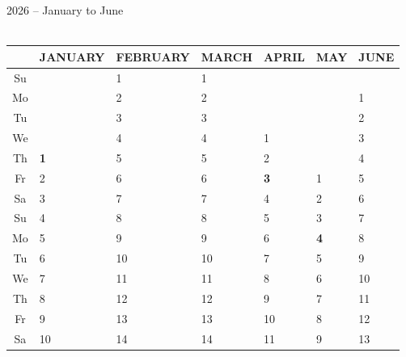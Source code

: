 \documentclass[a4paper]{article}
\newcommand{\monthstrut}{\rule{0pt}{12pt}}
\newcommand{\datestrut}{\rule{0pt}{12pt}}
\begin{document}
\pagestyle{empty}

\begin{center}
\hspace{1cm} {\LARGE 2026 -- January to June}\\
{\ } \\
\begin{tabular}{|c||p{2.5cm}|p{2.5cm}|p{2.5cm}|p{2.5cm}|p{2.5cm}|p{2.5cm}|}
\hline
 \multicolumn{1}{|c||}{\monthstrut\ }
 & \multicolumn{1}{|c|}{JANUARY}
 & \multicolumn{1}{|c|}{FEBRUARY}
 & \multicolumn{1}{|c|}{MARCH}
 & \multicolumn{1}{|c|}{APRIL}
 & \multicolumn{1}{|c|}{MAY}
 & \multicolumn{1}{|c|}{JUNE}
\\
\hline
\hline
\datestrut Su &  & 1 & 1 &  &  &  \\
\hline\hline
\datestrut Mo &  & 2 & 2 &  &  & 1 \\
\cline{1-1}\cline{3-3}\cline{4-4}\cline{7-7}
\datestrut Tu &  & 3 & 3 &  &  & 2 \\
\cline{1-1}\cline{3-3}\cline{4-4}\cline{5-5}\cline{7-7}
\datestrut We &  & 4 & 4 & 1 &  & 3 \\
\cline{1-1}\cline{2-2}\cline{3-3}\cline{4-4}\cline{5-5}\cline{7-7}
\datestrut Th & \textbf{1} & 5 & 5 & 2 &  & 4 \\
\cline{1-1}\cline{2-2}\cline{3-3}\cline{4-4}\cline{5-5}\cline{6-6}\cline{7-7}
\datestrut Fr & 2 & 6 & 6 & \textbf{3} & 1 & 5 \\
\cline{1-1}\cline{2-2}\cline{3-3}\cline{4-4}\cline{5-5}\cline{6-6}\cline{7-7}
\datestrut Sa & 3 & 7 & 7 & 4 & 2 & 6 \\
\cline{1-1}\cline{2-2}\cline{3-3}\cline{4-4}\cline{5-5}\cline{6-6}\cline{7-7}
\datestrut Su & 4 & 8 & 8 & 5 & 3 & 7 \\
\hline\hline
\datestrut Mo & 5 & 9 & 9 & 6 & \textbf{4} & 8 \\
\cline{1-1}\cline{2-2}\cline{3-3}\cline{4-4}\cline{5-5}\cline{6-6}\cline{7-7}
\datestrut Tu & 6 & 10 & 10 & 7 & 5 & 9 \\
\cline{1-1}\cline{2-2}\cline{3-3}\cline{4-4}\cline{5-5}\cline{6-6}\cline{7-7}
\datestrut We & 7 & 11 & 11 & 8 & 6 & 10 \\
\cline{1-1}\cline{2-2}\cline{3-3}\cline{4-4}\cline{5-5}\cline{6-6}\cline{7-7}
\datestrut Th & 8 & 12 & 12 & 9 & 7 & 11 \\
\cline{1-1}\cline{2-2}\cline{3-3}\cline{4-4}\cline{5-5}\cline{6-6}\cline{7-7}
\datestrut Fr & 9 & 13 & 13 & 10 & 8 & 12 \\
\cline{1-1}\cline{2-2}\cline{3-3}\cline{4-4}\cline{5-5}\cline{6-6}\cline{7-7}
\datestrut Sa & 10 & 14 & 14 & 11 & 9 & 13 \\

\end{tabular}
\end{center}
\end{document}
